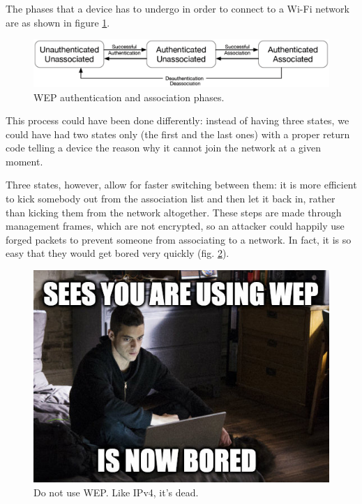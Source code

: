 The phases that a device has to undergo in order to connect to a Wi-Fi network are as shown in figure \ref{fig:wep_states}.

\begin{figure}[h]
    \centering
    \includegraphics[scale=0.3]{img/wep_states.png}
    \decoRule
    \caption{WEP authentication and association phases.}
    \label{fig:wep_states}
\end{figure}

This process could have been done differently: instead of having three states, we could have had two states only (the first and the last ones) with a proper return code telling a device the reason why it cannot join the network at a given moment.

Three states, however, allow for faster switching between them: it is more efficient to kick somebody out from the association list and then let it back in, rather than kicking them from the network altogether. These steps are made through management frames, which are not encrypted, so an attacker could happily use forged packets to prevent someone from associating to a network. In fact, it is so easy that they would get bored very quickly (fig. \ref{fig:boring_wep_meme}).

\begin{figure}[h]
    \centering
    \includegraphics[scale=0.6]{img/boring_wep_meme.jpg}
    \decoRule
    \caption{Do not use WEP. Like IPv4, it's dead.}
    \label{fig:boring_wep_meme}
\end{figure}

